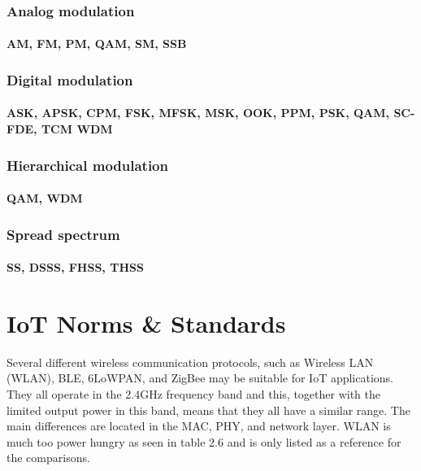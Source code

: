 \subsubsection{Analog modulation}
\paragraph{AM, FM, PM, QAM, SM, SSB}

\subsubsection{Digital modulation}
\paragraph{ASK, APSK, CPM, FSK, MFSK, MSK, OOK, PPM, PSK, QAM, SC-FDE, TCM WDM}

\subsubsection{Hierarchical modulation}
\paragraph{QAM, WDM} 

\subsubsection{Spread spectrum}
\paragraph{SS, DSSS, FHSS, THSS}






\section{IoT Norms \& Standards}






Several different wireless communication protocols,
	such as Wireless LAN (WLAN),
	BLE, 6LoWPAN,
	and ZigBee may be suitable for IoT applications.
They all operate in the 2.4GHz frequency band and this,
	together with the limited output power in this band,
	means that they all have a similar range.
The main differences are located in the MAC,
	PHY,
	and network layer.
WLAN is much too power hungry as seen in table 2.6 and is only listed as a reference for the comparisons.


